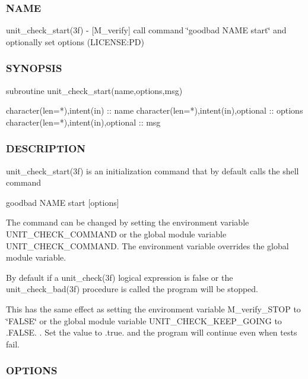 \subsubsection*{N\+A\+ME}

unit\+\_\+check\+\_\+start(3f) -\/ \mbox{[}M\+\_\+verify\mbox{]} call command \char`\"{}goodbad N\+A\+M\+E start\char`\"{} and optionally set options (L\+I\+C\+E\+N\+SE\+:PD) 

\subsubsection*{S\+Y\+N\+O\+P\+S\+IS}

\begin{DoxyVerb}subroutine unit_check_start(name,options,msg)

 character(len=*),intent(in)          :: name
 character(len=*),intent(in),optional :: options
 character(len=*),intent(in),optional :: msg
\end{DoxyVerb}


\subsubsection*{D\+E\+S\+C\+R\+I\+P\+T\+I\+ON}

unit\+\_\+check\+\_\+start(3f) is an initialization command that by default calls the shell command

goodbad N\+A\+ME start \mbox{[}options\mbox{]}

The command can be changed by setting the environment variable U\+N\+I\+T\+\_\+\+C\+H\+E\+C\+K\+\_\+\+C\+O\+M\+M\+A\+ND or the global module variable U\+N\+I\+T\+\_\+\+C\+H\+E\+C\+K\+\_\+\+C\+O\+M\+M\+A\+ND. The environment variable overrides the global module variable.

By default if a unit\+\_\+check(3f) logical expression is false or the unit\+\_\+check\+\_\+bad(3f) procedure is called the program will be stopped.

This has the same effect as setting the environment variable M\+\_\+verify\+\_\+\+S\+T\+OP to \char`\"{}\+F\+A\+L\+S\+E\char`\"{} or the global module variable U\+N\+I\+T\+\_\+\+C\+H\+E\+C\+K\+\_\+\+K\+E\+E\+P\+\_\+\+G\+O\+I\+NG to .F\+A\+L\+SE. . Set the value to .true. and the program will continue even when tests fail.

\subsubsection*{O\+P\+T\+I\+O\+NS}

